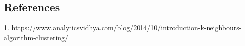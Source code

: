 \documentclass{article}
\begin{document}
\clearpage


\subsection{References}
1. https://www.analyticsvidhya.com/blog/2014/10/introduction-k-neighbours-algorithm-clustering/
\clearpage

\end{document}
